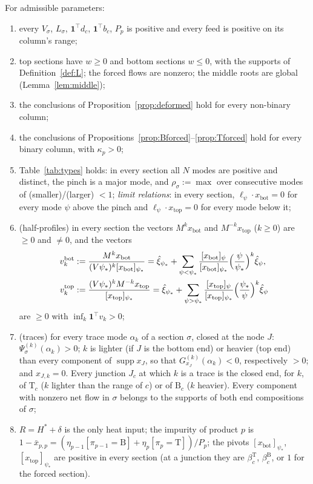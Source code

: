 \documentclass[11pt,a4paper]{report}
\newcommand{\one}{\mathbf 1}
\newcommand{\Hs}{H^{*}}
\newcommand{\Ts}{\mathrm T}
\newcommand{\Bs}{\mathrm B}
\newcommand{\xb}{x_{\mathrm{bot}}}
\newcommand{\xt}{x_{\mathrm{top}}}
\newcommand{\supp}{\operatorname{supp}}
\begin{document}
\begin{theorem}\label{thm:H}
For admissible parameters:
\begin{enumerate}[(H1)]
\item every \(V_\sigma\), \(L_\sigma\), \(\one^\top d_c\), \(\one^\top b_c\), \(P_p\) is positive and every feed is positive on its column's range;
\item top sections have \(w\ge0\) and bottom sections \(w\le0\), with the supports of Definition~\ref{def:L}; the forced flows are
nonzero; the middle roots are global (Lemma~\ref{lem:middle});
\item the conclusions of Proposition~\ref{prop:deformed} hold for every non-binary column;
\item the conclusions of Propositions~\ref{prop:Bforced}--\ref{prop:Tforced} hold for every binary column, with
\(\kappa_p>0\);
\item Table~\ref{tab:types} holds: in every section all \(N\) modes are positive and distinct, the pinch is a major mode, and
\(\rho_\sigma:=\max\) over consecutive modes of (smaller)/(larger) \(<1\); \emph{limit relations}: in every section,
\(\ell_\psi\cdot\xb=0\) for every mode \(\psi\) above the pinch and \(\ell_\psi\cdot\xt=0\) for every mode below it;
\item (half-profiles) in every section the vectors \(M^k\xb\) and \(M^{-k}\xt\) (\(k\ge0\)) are \(\ge0\) and \(\ne0\), and the vectors
\begin{align*}
v^{\mathrm{bot}}_k&:=\frac{M^k\xb}{(V\psi_*)^k[\xb]_{\psi_*}}=\hat\xi_{\psi_*}+\sum_{\psi<\psi_*}\frac{[\xb]_\psi}{[\xb]_{\psi_*}}\Bigl(\frac{\psi}{\psi_*}\Bigr)^k\hat\xi_\psi,\\
v^{\mathrm{top}}_k&:=\frac{(V\psi_*)^kM^{-k}\xt}{[\xt]_{\psi_*}}=\hat\xi_{\psi_*}+\sum_{\psi>\psi_*}\frac{[\xt]_\psi}{[\xt]_{\psi_*}}\Bigl(\frac{\psi_*}{\psi}\Bigr)^k\hat\xi_\psi
\end{align*}
are \(\ge0\) with \(\inf_k\one^\top v_k>0\);
\item (traces) for every trace mode \(\alpha_k\) of a section \(\sigma\), closed at the node \(J\): \(\Psi^{(k)}_\sigma(\alpha_k)>0\); \(k\) is
lighter (if \(J\) is the bottom end) or heavier (top end) than every component of \(\supp x_J\), so that
\(G^{(k)}_{x_J}(\alpha_k)<0\), respectively \(>0\); and \(x_{J,k}=0\). Every junction \(J_c\) at which \(k\) is a trace is the closed
end, for \(k\), of \(\Ts_c\) (\(k\) lighter than the range of \(c\)) or of \(\Bs_c\) (\(k\) heavier). Every component with nonzero net flow in
\(\sigma\) belongs to the supports of both end compositions of \(\sigma\);
\item \(R=\Hs+\delta\) is the only heat input; the impurity of product \(p\) is
\(1-\bar x_{p,p}=(\eta_{p-1}[\pi_{p-1}=\Bs]+\eta_p[\pi_p=\Ts])/P_p\); the pivots \([\xb]_{\psi_*}\), \([\xt]_{\psi_*}\) are positive in
every section (at a junction they are \(\beta^\Ts_c\), \(\beta^\Bs_c\), or \(1\) for the forced section).
\end{enumerate}
\end{theorem}
\end{document}

